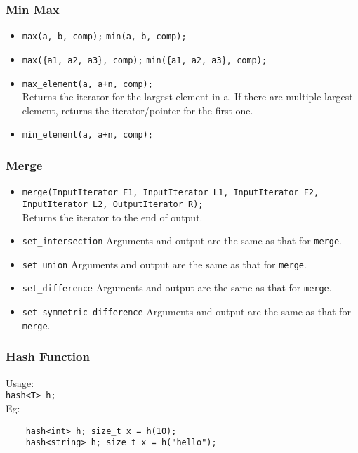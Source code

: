 \subsubsection{Min Max}
\begin{itemize}
\item \texttt{max(a, b, comp);} \texttt{min(a, b, comp);}
\item \texttt{max(\{a1, a2, a3\}, comp);} \texttt{min(\{a1, a2, a3\}, comp);}
\item \texttt{max\_element(a, a+n, comp);}\\
Returns the iterator for the largest element in a. If there are multiple largest element, returns the iterator/pointer for the first one.
\item \texttt{min\_element(a, a+n, comp);}\\
\end{itemize}

\subsubsection{Merge}
\begin{itemize}
\item \texttt{merge(InputIterator F1, InputIterator L1, InputIterator F2, InputIterator L2, OutputIterator R);} \\
Returns the iterator to the end of output.
\item \texttt{set\_intersection} Arguments and output are the same as that for \texttt{merge}.
\item \texttt{set\_union} Arguments and output are the same as that for \texttt{merge}.
\item \texttt{set\_difference} Arguments and output are the same as that for \texttt{merge}.
\item \texttt{set\_symmetric\_difference} Arguments and output are the same as that for \texttt{merge}.
\end{itemize}

\subsubsection{Hash Function}
Usage:\\
\texttt{hash<T> h;}\\
Eg:
\begin{verbatim}
    hash<int> h; size_t x = h(10);
    hash<string> h; size_t x = h("hello");
\end{verbatim}

